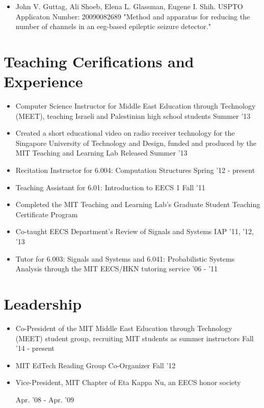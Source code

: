 \documentclass[margin]{res}
\begin{document}
\begin{resume}
\begin{itemize}
\item John V. Guttag, Ali Shoeb, Elena L. Glassman, Eugene I. Shih.
USPTO Applicaton Number: 20090082689 "Method and apparatus for reducing the number of channels in an eeg-based epileptic seizure detector."

\end{itemize}
 
\section{Teaching Cerifications and Experience}
\begin{itemize}
\item Computer Science Instructor for Middle East Education through Technology (MEET), teaching Israeli and Palestinian high school students \hfill Summer '13
\item Created a short educational video on radio receiver technology for the Singapore University of Technology and Design, funded and produced by the MIT Teaching and Learning Lab \hfill Released Summer '13
\item Recitation Instructor for 6.004: Computation Structures \hfill Spring '12 - present
\item Teaching Assistant for 6.01: Introduction to EECS 1 \hfill Fall '11

\item Completed the MIT Teaching and Learning Lab's Graduate Student Teaching Certificate Program
\item Co-taught EECS Department's Review of Signals and Systems \hfill IAP '11, '12, '13
\item Tutor for 6.003: Signals and Systems and 6.041: Probabilistic Systems Analysis through the MIT EECS/HKN tutoring service \hfill '06 - '11
\end{itemize}

\section{Leadership}
                \begin{itemize} \itemsep -2pt
                \item Co-President of the MIT Middle East Education through Technology (MEET) student group, recruiting MIT students as summer instructors \hfill Fall '14 - present
		\item MIT EdTech Reading Group Co-Organizer \hfill Fall '12 
                \item Vice-President, MIT Chapter of Eta Kappa Nu, an EECS honor society 
\begin{flushright}
Apr. '08 - Apr. '09
\end{flushright}      
\end{itemize}


\end{resume}
\end{document}
